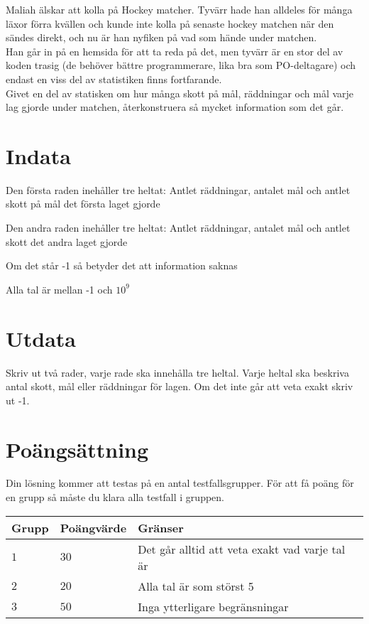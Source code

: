 

Maliah älskar att kolla på Hockey matcher. Tyvärr hade han alldeles för många läxor förra kvällen och kunde inte kolla på senaste hockey matchen när den sändes direkt, och nu är han nyfiken på vad som hände under matchen.\\ Han går in på en hemsida för att ta reda på det, men tyvärr är en stor del av koden trasig (de behöver bättre programmerare, lika bra som PO-deltagare) och endast en viss del av statistiken finns fortfarande.\\ Givet en del av statisken om hur många skott på mål, räddningar och mål varje lag gjorde under matchen, återkonstruera så mycket information som det går.
\section*{Indata}
Den första raden inehåller tre heltat: Antlet räddningar, antalet mål och antlet skott på mål det första laget gjorde

Den andra raden inehåller tre heltat: Antlet räddningar, antalet mål och antlet skott det andra laget gjorde

Om det står -1 så betyder det att information saknas

Alla tal är mellan -1 och $10^9$

\section*{Utdata}
Skriv ut två rader, varje rade ska innehålla tre heltal. Varje heltal ska beskriva antal skott, mål eller räddningar för lagen. Om det inte går att veta exakt skriv ut -1.

\section*{Poängsättning}
Din lösning kommer att testas på en antal testfallsgrupper.
För att få poäng för en grupp så måste du klara alla testfall i gruppen.

\noindent
\begin{tabular}{| l | l | l |}
  \hline
  Grupp & Poängvärde & Gränser \\ \hline
  $1$   & $30$        & Det går alltid att veta exakt vad varje tal är \\ \hline
  $2$   & $20$       & Alla tal är som störst 5 \\ \hline
  $3$   & $50$       & Inga ytterligare begränsningar \\ \hline
\end{tabular}


